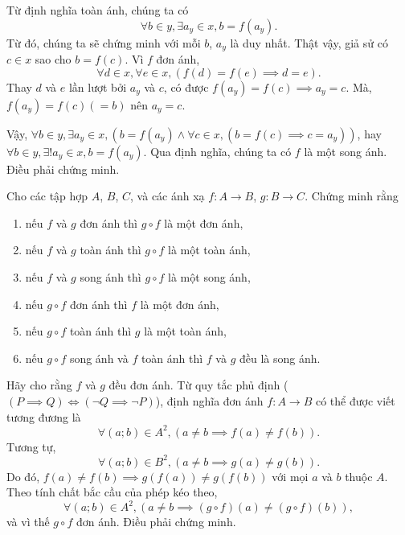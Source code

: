 \solution

Từ định nghĩa toàn ánh, chúng ta có 
\begin{equation*}
   \forall b \in y, \exists a_y \in x, b = f(a_y).
\end{equation*}
Từ đó, chúng ta sẽ chứng minh với mỗi $b$, $a_y$ là duy nhất. Thật vậy, giả sử có $c \in x$ sao cho $b = f(c)$. Vì $f$ đơn ánh,
\begin{equation*}
   \forall d \in x, \forall e \in x, (f(d) = f(e) \implies d = e).
\end{equation*} 
Thay $d$ và $e$ lần lượt bởi $a_y$ và $c$, có được $f(a_y) = f(c) \implies a_y = c$. Mà, $f(a_y) = f(c) (= b)$ nên $a_y = c$.

Vậy, $\forall b \in y, \exists a_y \in x, \left(b = f(a_y) \land \forall c \in x, (b = f(c) \implies c = a_y)\right)$, hay $\forall b \in y, \exists! a_y \in x, b = f(a_y)$. Qua định nghĩa, chúng ta có $f$ là một song ánh. Điều phải chứng minh.

 Cho các tập hợp $A$, $B$, $C$, và các ánh xạ $f: A \to B$, $g: B \to C$. Chứng minh rằng
\begin{enumerate}
   \item nếu $f$ và $g$ đơn ánh thì $g \circ f$ là một đơn ánh,
   \item nếu $f$ và $g$ toàn ánh thì $g \circ f$ là một toàn ánh,
   \item nếu $f$ và $g$ song ánh thì $g \circ f$ là một song ánh,
   \item nếu $g \circ f$ đơn ánh thì $f$ là một đơn ánh,
   \item nếu $g \circ f$ toàn ánh thì $g$ là một toàn ánh,
   \item nếu $g \circ f$ song ánh và $f$ toàn ánh thì $f$ và $g$ đều là song ánh.
\end{enumerate}


\resetSubexercise Hãy cho rằng $f$ và $g$ đều đơn ánh. Từ quy tắc phủ định ($(P \implies Q) \iff (\neg Q \implies \neg P)$), định nghĩa đơn ánh $f:A \to B$ có thể được viết tương đương là 
\begin{equation*}
   \forall (a; b) \in A^2, \left(a \neq b \implies f(a) \neq f(b)\right).
\end{equation*}
Tương tự, \begin{equation*}
   \forall (a; b) \in B^2, \left(a \neq b \implies g(a) \neq g(b)\right).
\end{equation*}
Do đó, $f(a) \neq f(b) \implies g(f(a)) \neq g(f(b))$ với mọi $a$ và $b$ thuộc $A$. Theo tính chất bắc cầu của phép kéo theo, \begin{equation*}
   \forall (a; b) \in A^2, \left(a \neq b \implies (g\circ f)(a) \neq (g\circ f)(b)\right),
\end{equation*}
và vì thế $g \circ f$ đơn ánh. Điều phải chứng minh.

